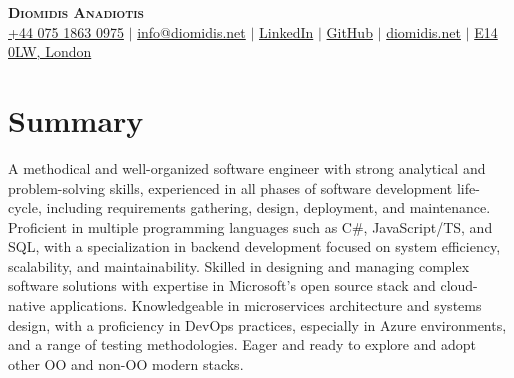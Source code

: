 \documentclass[letterpaper,11pt]{article}
\renewcommand{\headrulewidth}{0pt}
\renewcommand{\footrulewidth}{0pt}
\begin{document}

\begin{adjustwidth}{-0.2in}{-0.2in}
  \begin{center}
      \textbf{\LARGE \scshape Diomidis Anadiotis} \\ \vspace{3pt}
      \small
      \faMobile \hspace{.5pt} \href{tel:447518630975}{+44 075 1863 0975}
      $|$
      \faAt \hspace{.5pt} \href{mailto:info@diomidis.net}{info@diomidis.net}
      $|$
      \faLinkedinSquare \hspace{.5pt} \href{https://www.linkedin.com/in/diomidis-anadiotis/}{LinkedIn}
      $|$
      \faGithub \hspace{.5pt} \href{https://github.com/diomidis}{GitHub}
      $|$
      \faGlobe \hspace{.5pt} \href{https://diomidis.net}{diomidis.net}
      $|$
      \faMapMarker \hspace{.5pt} \href{}{E14 0LW, London}
  \end{center}
  \end{adjustwidth}
  

\pagestyle{fancy}
\fancyhf{} %
\renewcommand{\headrulewidth}{0pt}
\renewcommand{\footrulewidth}{0pt}

\section{Summary}
\small{
  A methodical and well-organized software engineer with strong analytical and problem-solving skills, experienced in all phases of software development life-cycle, 
  including requirements gathering, design, deployment, and maintenance. Proficient in multiple programming languages such as C\#, JavaScript/TS, and SQL, with a specialization 
  in backend development focused on system efficiency, scalability, and maintainability. Skilled in designing and managing complex software solutions with expertise in Microsoft's open source stack and cloud-native applications.
  Knowledgeable in microservices architecture and systems design, with a proficiency in DevOps practices, especially in Azure environments, and a range of testing methodologies. 
  Eager and ready to explore and adopt other OO and non-OO modern stacks.
} \vspace{-5pt}


\end{document}
